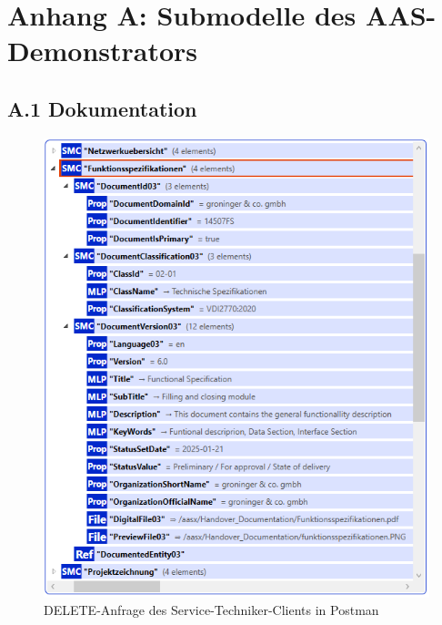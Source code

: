 \newpage
\section{Anhang A: Submodelle des AAS-Demonstrators}
\subsection{A.1 Dokumentation}

\begin{figure}[htbp]
    \centering
        \includegraphics[width=1\textwidth]{Bilder/ErgebnissePackageExplorer/SMCDokumentation.PNG}
    \caption{DELETE-Anfrage des Service-Techniker-Clients in Postman}
    \label{fig:KeycloakAnmeldeSeite}
\end{figure}

